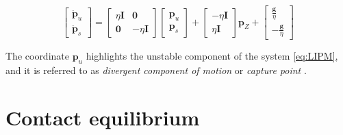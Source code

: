 \begin{equation*}
    \begin{bmatrix}
        \dot{\bm{p}}_u \\ \dot{\bm{p}}_s
    \end{bmatrix}
    =
    \begin{bmatrix}
        \eta\bm{I} &  \bm{0} \\
        \bm{0} & -\eta\bm{I}
    \end{bmatrix}
    \begin{bmatrix}
        \bm{p}_u \\ \bm{p}_s
    \end{bmatrix}
    +
    \begin{bmatrix}
        -\eta \bm{I} \\ \eta \bm{I}
    \end{bmatrix}
    \bm{p}_Z 
    +
    \begin{bmatrix}
        \frac{\bm{g}}{\eta} \\ -\frac{\bm{g}}{\eta}
    \end{bmatrix}
\end{equation*}

The coordinate $\bm{p}_u$ highlights the unstable component of the system
\eqref{eq:LIPM}, and it is referred to as \textit{divergent component of motion}
\cite{Englsberger2015TRO} or \textit{capture point}
\cite{Pratt2006CapturePoint}.

\section{Contact equilibrium}
\label{sec:contact-equilibrium}
%
%

